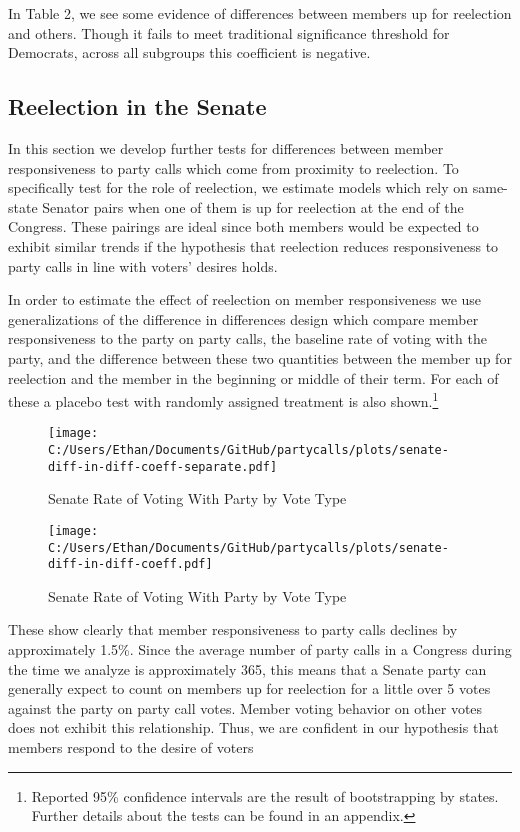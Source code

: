\documentclass[12pt]{article}
\begin{document}
In Table 2, we see some evidence of differences between members up for reelection and others. Though it fails to meet traditional significance threshold for Democrats, across all subgroups this coefficient is negative. 

\subsection{Reelection in the Senate}

In this section we develop further tests for differences between member responsiveness to party calls which come from proximity to reelection. To specifically test for the role of reelection, we estimate models which rely on same-state Senator pairs when one of them is up for reelection at the end of the Congress. These pairings are ideal since both members would be expected to exhibit similar trends if the hypothesis that reelection reduces responsiveness to party calls in line with voters' desires holds. 

In order to estimate the effect of reelection on member responsiveness we use generalizations of the difference in differences design which compare member responsiveness to the party on party calls, the baseline rate of voting with the party, and the difference between these two quantities between the member up for reelection and the member in the beginning or middle of their term. For each of these a placebo test with randomly assigned treatment is also shown.\footnote{Reported 95\% confidence intervals are the result of bootstrapping by states. Further details about the tests can be found in an appendix.}

\begin{figure}[H]
	\centering
	\caption{Senate Rate of Voting With Party by Vote Type}
	\texttt{[image: C:/Users/Ethan/Documents/GitHub/partycalls/plots/senate-diff-in-diff-coeff-separate.pdf]}
\end{figure}

\begin{figure}[H]
	\centering
	\caption{Senate Rate of Voting With Party by Vote Type}
	\texttt{[image: C:/Users/Ethan/Documents/GitHub/partycalls/plots/senate-diff-in-diff-coeff.pdf]}
\end{figure}

These show clearly that member responsiveness to party calls declines by approximately 1.5\%. Since the average number of party calls in a Congress during the time we analyze is approximately 365, this means that a Senate party can generally expect to count on members up for reelection for a little over 5 votes against the party on party call votes. Member voting behavior on other votes does not exhibit this relationship. Thus, we are confident in our hypothesis that members respond to the desire of voters
\end{document}
